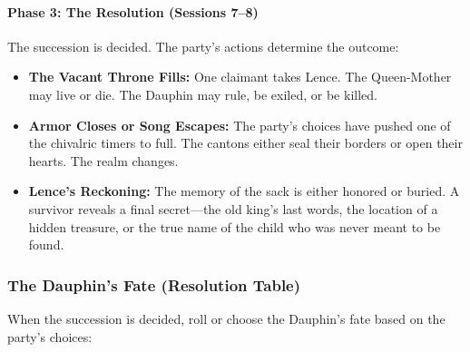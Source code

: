 \paragraph{Phase 3: The Resolution (Sessions 7--8)}
The succession is decided. The party's actions determine the outcome:

\begin{itemize}
  \item \textbf{The Vacant Throne Fills:} One claimant takes Lence. The Queen-Mother may live or die. The Dauphin may rule, be exiled, or be killed.
  \item \textbf{Armor Closes or Song Escapes:} The party's choices have pushed one of the chivalric timers to full. The cantons either seal their borders or open their hearts. The realm changes.
  \item \textbf{Lence's Reckoning:} The memory of the sack is either honored or buried. A survivor reveals a final secret---the old king's last words, the location of a hidden treasure, or the true name of the child who was never meant to be found.
\end{itemize}

\subsubsection*{The Dauphin's Fate (Resolution Table)}
When the succession is decided, roll or choose the Dauphin's fate based on the party's choices:


